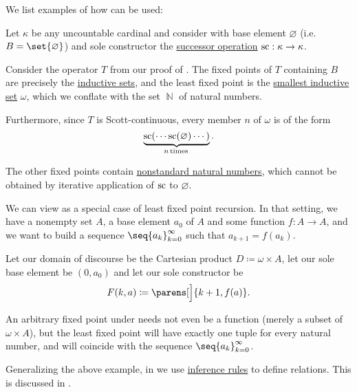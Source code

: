 \begin{example}\label{ex:thm:least_fixed_point_recursion}
  We list examples of how  can be used:
  \begin{thmenum}
     Let \( \kappa \) be any uncountable cardinal and consider  with base element \( \varnothing \) (i.e. \( B = \set{ \varnothing } \)) and sole constructor the \hyperref[def:ordinal_successor]{successor operation} \( \op{sc}: \kappa \to \kappa \).

    Consider the operator \( T \) from our proof of . The fixed points of \( T \) containing \( B \) are precisely the \hyperref[def:inductive_set]{inductive sets}, and the least fixed point is the \hyperref[thm:smallest_inductive_set_existence]{smallest inductive set} \( \omega \), which we conflate with the set \( \BbbN \) of natural numbers.

    Furthermore, since \( T \) is Scott-continuous, every member \( n \) of \( \omega \) is of the form
    \begin{equation*}
      \underbrace{ \op{sc}( \cdots \op{sc}(\varnothing) \cdots ) }_{n \T*{times}}.
    \end{equation*}

    The other fixed points contain \hyperref[rem:standard_models_of_arithmetic]{nonstandard natural numbers}, which cannot be obtained by iterative application of \( \op{sc} \) to \( \varnothing \).

     We can view  as a special case of least fixed point recursion. In that setting, we have a nonempty set \( A \), a base element \( a_0 \) of \( A \) and some function \( f: A \to A \), and we want to build a sequence \( \seq{ a_k }_{k=0}^\infty \) such that \( a_{k+1} = f(a_k) \).

    Let our domain of discourse be the Cartesian product \( D \coloneqq \omega \times A \), let our sole base element be \( (0, a_0) \) and let our sole constructor be
    \begin{equation*}
      F(k, a) \coloneqq \parens[\Big]{ k + 1, f(a) }.
    \end{equation*}

    An arbitrary fixed point under  needs not even be a function (merely a subset of \( \omega \times A \)), but the least fixed point will have exactly one tuple for every natural number, and will coincide with the sequence \( \seq{ a_k }_{k=0}^\infty \).

     Generalizing the above example, in  we use \hyperref[def:inference_rule]{inference rules} to define relations. This is discussed in .
  \end{thmenum}
\end{example}

